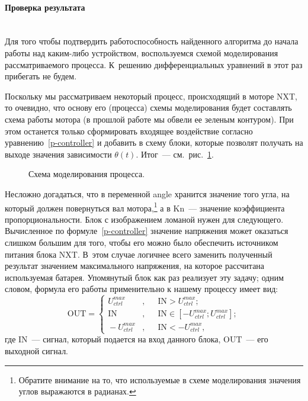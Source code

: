 \documentclass[12pt,a4paper,openany]{extarticle}
\begin{document}
\paragraph*{Проверка результата}$\phantom{-}$\\
\hspace*{\parindent}Для того чтобы подтвердить работоспособность найденного алгоритма до начала работы над каким-либо устройством, воспользуемся схемой моделирования рассматриваемого процесса.
К~решению дифференциальных уравнений в этот раз прибегать не будем.  

Поскольку мы рассматриваем некоторый процесс, происходящий в моторе NXT, то очевидно, что основу его (процесса) схемы моделирования будет составлять схема работы мотора (в прошлой работе мы обвели ее зеленым контуром).
При этом останется только сформировать входящее воздействие согласно уравнению~\eqref{p-controller} и добавить в схему блоки, которые позволят получать на выходе значения зависимости $\theta(t)$.
Итог~--- см.~рис.~\ref{struct_sheme}.

\begin{figure}[h]
	\caption{Схема моделирования процесса.}
	\label{struct_sheme}
\end{figure}

Несложно догадаться, что в переменной angle хранится значение того угла, на который должен повернуться вал мотора\lefteqn,\footnote{Обратите внимание на то, что используемые в схеме моделирования значения углов выражаются в радианах.} а в Kn~--- значение коэффициента пропорциональности.
Блок с изображением ломаной нужен для следующего.
Вычисленное по формуле~\eqref{p-controller} значение напряжения может оказаться слишком большим для того, чтобы его можно было обеспечить источником питания блока NXT.
В~этом случае логичнее всего заменить полученный результат значением максимального напряжения, на которое рассчитана используемая батарея.
Упомянутый блок как раз реализует эту задачу; одним словом, формула его работы применительно к нашему процессу имеет вид:
\begin{equation}
	\mathrm{OUT} = 
	\left\{
	\begin{aligned}
		\!U_{ctrl}^{max}&, &&\mathrm{IN} > U_{ctrl}^{max}; \\
		\!\mathrm{IN}&, &&\mathrm{IN} \in \left[-U_{ctrl}^{max}; U_{ctrl}^{max}\right]; \\
		\!-U_{ctrl}^{max}&, &&\mathrm{IN} < -U_{ctrl}^{max},
	\end{aligned}
	\right.
\end{equation}
где $\mathrm{IN}$~--- сигнал, который подается на вход данного блока, $\mathrm{OUT}$~--- его выходной сигнал.
\end{document}
